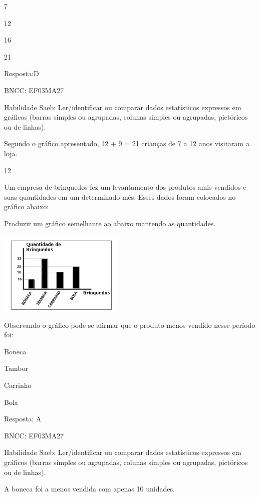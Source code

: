\begin{escolha}
\begin{escolha}

\item
  7
\item
  12
\item
  16
\item
  21
\end{escolha}

Resposta:D

BNCC: EF03MA27

Habilidade Saeb: Ler/identificar ou comparar dados estatísticos
expressos em gráficos (barras simples ou agrupadas, colunas simples ou
agrupadas, pictóricos ou de linhas).

Segundo o gráfico apresentado, 12 + 9 = 21 crianças de 7 a 12 anos
visitaram a loja.

\num{12}

Um empresa de brinquedos fez um levantamento dos produtos amis vendidos
e suas quantidades em um determinado mês. Esses dados foram colocados no
gráfico abaixo:

Produzir um gráfico semelhante ao abaixo mantendo as quantidades.

\includegraphics[width=2.35294in,height=1.56863in]{media/image137.png}

Observando o gráfico pode-se afirmar que o produto menos vendido nesse
período foi:

\begin{escolha}

\item
  Boneca
\item
  Tambor
\item
  Carrinho
\item
  Bola
\end{escolha}

Resposta: A

BNCC: EF03MA27

Habilidade Saeb: Ler/identificar ou comparar dados estatísticos
expressos em gráficos (barras simples ou agrupadas, colunas simples ou
agrupadas, pictóricos ou de linhas).

A boneca foi a menos vendida com apenas 10 unidades.


\end{escolha}
